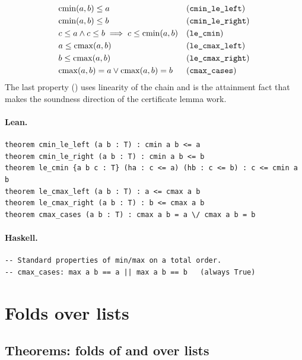\documentclass[11pt,a4paper]{article}
\begin{document}
\begin{thm}
\begin{align*}
  &\mathrm{cmin}(a,b) \le a && \text{(\texttt{cmin\_le\_left})} \\
  &\mathrm{cmin}(a,b) \le b && \text{(\texttt{cmin\_le\_right})} \\
  &c \le a \wedge c \le b \implies c \le \mathrm{cmin}(a,b) && \text{(\texttt{le\_cmin})} \\
  &a \le \mathrm{cmax}(a,b) && \text{(\texttt{le\_cmax\_left})} \\
  &b \le \mathrm{cmax}(a,b) && \text{(\texttt{le\_cmax\_right})} \\
  &\mathrm{cmax}(a,b) = a \vee \mathrm{cmax}(a,b) = b && \text{(\texttt{cmax\_cases})}
\end{align*}
The last property () uses linearity of the chain and is the
attainment fact that makes the soundness direction of the certificate lemma work.
\end{thm}

\paragraph{Lean.}
\begin{lstlisting}[style=lean]
theorem cmin_le_left (a b : T) : cmin a b <= a
theorem cmin_le_right (a b : T) : cmin a b <= b
theorem le_cmin {a b c : T} (ha : c <= a) (hb : c <= b) : c <= cmin a b
theorem le_cmax_left (a b : T) : a <= cmax a b
theorem le_cmax_right (a b : T) : b <= cmax a b
theorem cmax_cases (a b : T) : cmax a b = a \/ cmax a b = b
\end{lstlisting}

\paragraph{Haskell.}
\begin{lstlisting}[style=haskell]
-- Standard properties of min/max on a total order.
-- cmax_cases: max a b == a || max a b == b   (always True)
\end{lstlisting}

\section{Folds over lists}

\subsection{Theorems: folds of  and  over lists}
\end{document}

